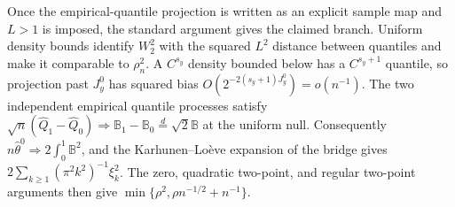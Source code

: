 Once the empirical-quantile projection is written as an explicit sample map and \(L>1\) is imposed, the standard argument gives the claimed branch.  Uniform density bounds identify \(W_2^2\) with the squared \(L^2\) distance between quantiles and make it comparable to \(\rho_n^2\).  A \(C^{s_y}\) density bounded below has a \(C^{s_y+1}\) quantile, so projection past \(J_y^0\) has squared bias \(O(2^{-2(s_y+1)J_y^0})=o(n^{-1})\).  The two independent empirical quantile processes satisfy \(\sqrt n(\widehat Q_1-\widehat Q_0)\Rightarrow\mathbb B_1-\mathbb B_0\stackrel{d}{=}\sqrt2\mathbb B\) at the uniform null.  Consequently \(n\widehat\theta^0\Rightarrow2\int_0^1\mathbb B^2\), and the Karhunen--Lo\`eve expansion of the bridge gives \(2\sum_{k\ge1}(\pi^2k^2)^{-1}\xi_k^2\).  The zero, quadratic two-point, and regular two-point arguments then give \(\min\{\rho^2,\rho n^{-1/2}+n^{-1}\}\).